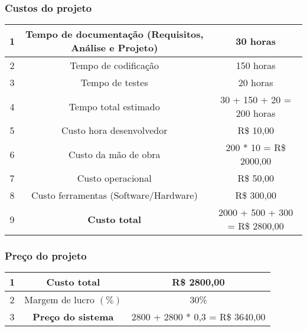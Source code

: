             \subsubsection*{Custos do projeto}
            
                \begin{center}
                    
                    \begin{tabular}{| c | c | c |} \hline
                         1 & Tempo de documentação (Requisitos, Análise e Projeto) & 30 horas \\ \hline
                         2 & Tempo de codificação & 150 horas \\ \hline
                         3 & Tempo de testes & 20 horas \\ \hline
                         4 & Tempo total estimado & 30 + 150 + 20 = 200 horas \\ \hline \hline
                         5 & Custo hora desenvolvedor & R\$ 10,00 \\ \hline
                         6 & Custo da mão de obra & 200 * 10 = R\$ 2000,00 \\ \hline \hline
                         7 & Custo operacional & R\$ 50,00 \\ \hline
                         8 & Custo ferramentas (Software/Hardware) & R\$ 300,00 \\ \hline \hline
                         9 & \textbf{Custo total} & 2000 + 500 + 300 = R\$ 2800,00 \\ \hline
                    \end{tabular}
                    
                \end{center}
            
            \subsubsection*{Preço do projeto}
            
                \begin{center}
                    
                    \begin{tabular}{| c | c | c |} \hline
                         1 & Custo total & R\$ 2800,00 \\ \hline
                         2 & Margem de lucro $(\%)$ & 30\% \\ \hline 
                         3 & \textbf{Preço do sistema} & 2800 + 2800 * 0,3 = R\$ 3640,00 \\ \hline
                    \end{tabular}
                    
                \end{center}    
                
